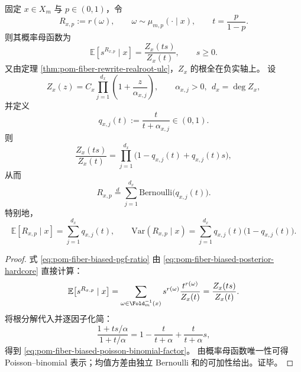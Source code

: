 \begin{theorem}\label{thm:pom-fiber-biased-posterior-poisson-binomial}
固定 \(x\in X_m\) 与 \(p\in(0,1)\)，令
\[
R_{x,p}:=r(\omega),\qquad \omega\sim \mu_{m,p}(\cdot\mid x),
\qquad
t=\frac{p}{1-p}.
\]
则其概率母函数为
\begin{equation}\label{eq:pom-fiber-biased-pgf-ratio}
\mathbb E\!\left[s^{R_{x,p}}\mid x\right]
=\frac{Z_x(ts)}{Z_x(t)},\qquad s\ge 0.
\end{equation}
又由定理 \ref{thm:pom-fiber-rewrite-realroot-ulc}，\(Z_x\) 的根全在负实轴上。
设
\[
Z_x(z)=C_x\prod_{j=1}^{d_x}\left(1+\frac{z}{\alpha_{x,j}}\right),
\qquad
\alpha_{x,j}>0,\ \ d_x=\deg Z_x,
\]
并定义
\[
q_{x,j}(t):=\frac{t}{t+\alpha_{x,j}}\in(0,1).
\]
则
\begin{equation}\label{eq:pom-fiber-biased-poisson-binomial-factor}
\frac{Z_x(ts)}{Z_x(t)}
=\prod_{j=1}^{d_x}\bigl(1-q_{x,j}(t)+q_{x,j}(t)s\bigr),
\end{equation}
从而
\[
R_{x,p}\overset{d}{=}\sum_{j=1}^{d_x}\mathrm{Bernoulli}\bigl(q_{x,j}(t)\bigr).
\]
特别地，
\[
\mathbb E[R_{x,p}\mid x]=\sum_{j=1}^{d_x}q_{x,j}(t),\qquad
\mathrm{Var}(R_{x,p}\mid x)=\sum_{j=1}^{d_x}q_{x,j}(t)\bigl(1-q_{x,j}(t)\bigr).
\]
\end{theorem}
\begin{proof}
式 \eqref{eq:pom-fiber-biased-pgf-ratio} 由
\eqref{eq:pom-fiber-biased-posterior-hardcore} 直接计算：
\[
\mathbb E\!\left[s^{R_{x,p}}\mid x\right]
=\sum_{\omega\in\Fold_m^{-1}(x)}s^{r(\omega)}\frac{t^{r(\omega)}}{Z_x(t)}
=\frac{Z_x(ts)}{Z_x(t)}.
\]
将根分解代入并逐因子化简：
\[
\frac{1+ts/\alpha}{1+t/\alpha}
=1-\frac{t}{t+\alpha}+\frac{t}{t+\alpha}s,
\]
得到 \eqref{eq:pom-fiber-biased-poisson-binomial-factor}。
由概率母函数唯一性可得 Poisson--binomial 表示；均值方差由独立 Bernoulli 和的可加性给出。证毕。
\end{proof}



